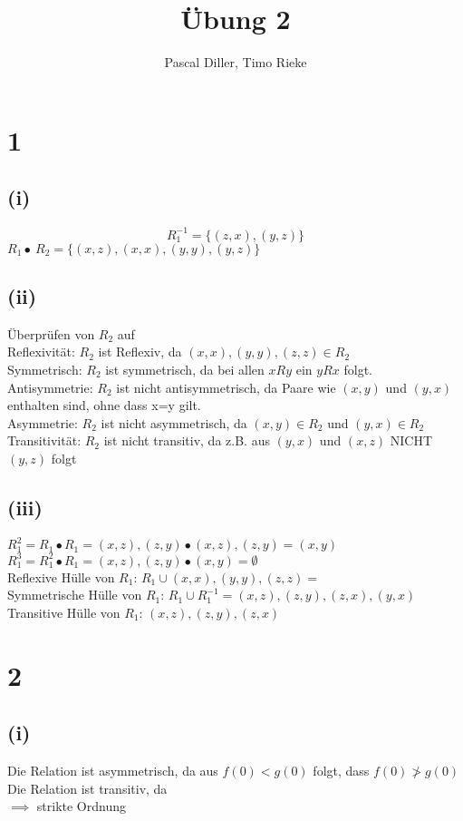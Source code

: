 \documentclass{article}
\title{Übung 2}
\author{Pascal Diller, Timo Rieke}
\begin{document}
\maketitle

\section{1}
\subsection{(i)}
\[R_1^{-1} = \{(z,x),(y,z)\}\]
$R_1 \bullet\ R_2 = \{(x,z),(x,x),(y,y),(y,z)\} $
\subsection{(ii)}
Überprüfen von $R_2$ auf \\
Reflexivität: 
$R_2$ ist Reflexiv, da $(x,x),(y,y),(z,z) \in R_2$ \\ 
Symmetrisch: 
$R_2$ ist symmetrisch, da bei allen $xRy$ ein $yRx$ folgt. \\
Antisymmetrie: 
$R_2$ ist nicht antisymmetrisch, da Paare wie $(x,y)$ und $(y,x)$ enthalten sind, ohne dass x=y gilt. \\
Asymmetrie: 
$R_2$ ist nicht asymmetrisch, da $(x,y) \in R_2$ und $(y,x) \in R_2$ \\ 
Transitivität:
$R_2$ ist nicht transitiv, da z.B. aus $(y,x)$ und $(x,z)$ NICHT $(y,z)$ folgt
\subsection{(iii)}
$R_1^{2} = R_1 \bullet R_1 = {(x,z),(z,y)} \bullet {(x,z),(z,y)} = {(x,y)}$ \\
$R_1^{3} = R_1^{2} \bullet R_1 = {(x,z),(z,y)} \bullet {(x,y)} = \emptyset$  \\
Reflexive Hülle von $R_1$: $R_1 \cup {(x,x),(y,y),(z,z)} =$ \\
Symmetrische Hülle von $R_1$: $R_1 \cup R_1^{-1} = {(x,z),(z,y),(z,x),(y,x)}$ \\
Transitive Hülle von $R_1$: ${(x,z),(z,y),(z,x)}$

\section{2}
\subsection{(i)}
Die Relation ist asymmetrisch, da aus $f(0) < g(0)$ folgt, dass $f(0) \ngtr g(0)$ \\
Die Relation ist transitiv, da \\
$\implies$ strikte Ordnung
\end{document}

